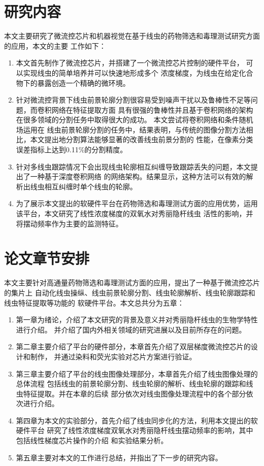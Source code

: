 \section{研究内容}
\label{sec:intro:org}
	本文主要研究了微流控芯片和机器视觉在基于线虫的药物筛选和毒理测试研究方面的应用，本文的主要
	工作如下：
	\begin{enumerate}
	  \item 本文首先制作了微流控芯片，并搭建了一个微流控芯片控制的硬件平台，
	  可以实现线虫的简单培养并可以快速地形成多个
	  浓度梯度，为线虫在给定化合物下的暴露创造一个精确的微环境。
	  \item 针对微流控背景下线虫前景轮廓分割很容易受到噪声干扰以及鲁棒性不足等问题，而卷积网络在特征提取方面
	  具有很强的鲁棒性并且基于卷积网络的架构在很多领域的分割任务中取得很大的成功。
	  本文尝试将卷积网络和条件随机场运用在
	  线虫前景轮廓分割的任务中，结果表明，与传统的图像分割方法相比，本文提出地分割算法能够显著的改善线虫前景分割的
	  性能，在像素分类误差指标上达到0.11\%的分割精度。
	  \item 针对多线虫跟踪情况下会出现线虫轮廓相互纠缠导致跟踪丢失的问题，本文提出了一种基于深度卷积网络
	  的网络架构。结果显示，这种方法可以有效的解析出线虫相互纠缠时单个线虫的轮廓。
	  \item 为了展示本文提出的软硬件平台在药物筛选和毒理测试方面的应用优势，运用该平台，本文研究了线性浓度梯度的双氧水对秀丽隐杆线虫
	  活性的影响，并将摆动频率作为主要的监测特征。
	\end{enumerate}
	
\section{论文章节安排}
	本文主要针对高通量药物筛选和毒理测试方面的应用，提出了一种基于微流控芯片的集片上
	自动化线虫操纵、线虫前景轮廓分割、线虫轮廓解析、线虫轮廓跟踪和线虫特征提取等功能的
	软硬件平台。本文总共分为五章：
	\begin{enumerate}
	  \item 第一章为绪论，介绍了本文研究的背景及意义并对秀丽隐杆线虫的生物学特性进行介绍。
	  并介绍了国内外相关领域的研究进展以及目前所存在的问题。
	  \item 第二章主要介绍了平台的硬件部分，本章首先介绍了双层梯度微流控芯片的设计和制作，
	  并通过染料和荧光实验对芯片方案进行验证。
	  \item 第三章主要介绍了平台的线虫图像处理部分，本章首先介绍了线虫图像处理的总体流程
	  包括线虫的前景轮廓分割、线虫轮廓的解析、线虫轮廓的跟踪和线虫特征提取。并在本章的后续
	  部分依次对线虫图像处理流程中的各个部分依次进行介绍。
	  \item 第四章为本文的实验部分，首先介绍了线虫同步化的方法，利用本文提出的软硬件平台
	  研究了线性浓度梯度双氧水对秀丽隐杆线虫摆动频率的影响，其中包括线性梯度芯片操作的介绍
	  和实验结果分析。
	  \item 第五章主要对本文的工作进行总结，并指出了下一步的研究内容。
	\end{enumerate}
\label{sec:intro:org}










